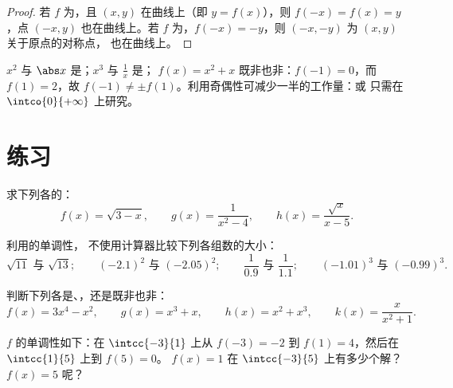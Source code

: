 \begin{proof}
若 $f$ 为，且 $(x, y)$ 在曲线上（即 $y = f(x)$），则
$f(-x) = f(x) = y$，点 $(-x, y)$ 也在曲线上。若
$f$ 为，$f(-x) = -y$，则 $(-x, -y)$ 为 $(x,y)$ 关于原点的对称点，
也在曲线上。
\end{proof}

\begin{example}
$x^2$ 与 $\abs x$ 是；$x^3$ 与 $\frac1x$ 是；
$f(x) = x^2 + x$ 既非也非：$f(-1) = 0$，而 $f(1) = 2$，故
$f(-1) \neq \pm f(1)$。利用奇偶性可减少一半的工作量：或
只需在 $\intco{0}{+\infty}$ 上研究。
\end{example}

\section{练习}

\begin{exercise}[$\star$]\label{exo:g11:func:1}
求下列各的：
\[
f(x) = \sqrt{3 - x}, \qquad
g(x) = \frac{1}{x^2 - 4}, \qquad
h(x) = \frac{\sqrt{x}}{x - 5} .
\]
\end{exercise}

\begin{exercise}[$\star$]\label{exo:g11:func:2}
利用的单调性，
不使用计算器比较下列各组数的大小：
\[
\sqrt{11} \text{ 与 } \sqrt{13}; \qquad
(-2.1)^2 \text{ 与 } (-2.05)^2; \qquad
\frac{1}{0.9} \text{ 与 } \frac{1}{1.1}; \qquad
(-1.01)^3 \text{ 与 } (-0.99)^3 .
\]
\end{exercise}

\begin{exercise}[$\star$]\label{exo:g11:func:3}
判断下列各是、，还是既非也非：
\[
f(x) = 3x^4 - x^2, \qquad
g(x) = x^3 + x, \qquad
h(x) = x^2 + x^3, \qquad
k(x) = \frac{x}{x^2+1} .
\]
\end{exercise}

\begin{exercise}[$\star$]\label{exo:g11:func:4}
 $f$ 的单调性如下：在
$\intcc{-3}{1}$ 上从 $f(-3) = -2$ 到 $f(1) = 4$，然后在
$\intcc{1}{5}$ 上到 $f(5) = 0$。
$f(x) = 1$ 在 $\intcc{-3}{5}$ 上有多少个解？$f(x) = 5$ 呢？
\end{exercise}

